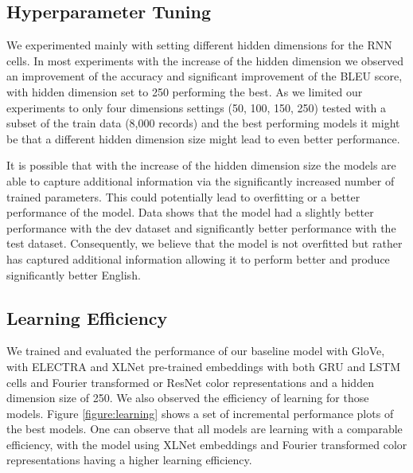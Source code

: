\subsection{Hyperparameter Tuning}
We experimented mainly with setting different hidden dimensions for the RNN cells. In most experiments with the increase of the hidden dimension we observed an improvement of the accuracy and significant improvement of the BLEU score, with hidden dimension set to 250 performing the best. As we limited our experiments to only four dimensions settings (50, 100, 150, 250) tested with a subset of the train data (8,000 records) and the best performing models it might be that a different hidden dimension size might lead to even better performance.

\par
It is possible that with the increase of the hidden dimension size the models are able to capture additional information via the significantly increased number of trained parameters. This could potentially lead to overfitting or a better performance of the model. Data shows that the model had a slightly better performance with the dev dataset and significantly better performance with the test dataset. Consequently, we believe that the model is not overfitted but rather has captured additional information allowing it to perform better and produce significantly better English.

\subsection{Learning Efficiency}
We trained and evaluated the performance of our baseline model with GloVe, with ELECTRA and XLNet pre-trained embeddings with both GRU and LSTM cells and Fourier transformed or ResNet color representations and a hidden dimension size of 250. We also observed the efficiency of learning for those models. Figure \ref{figure:learning} shows a set of incremental performance plots of the best models. One can observe that all models are learning with a comparable efficiency, with the model using XLNet embeddings and Fourier transformed color representations having a higher learning efficiency.

